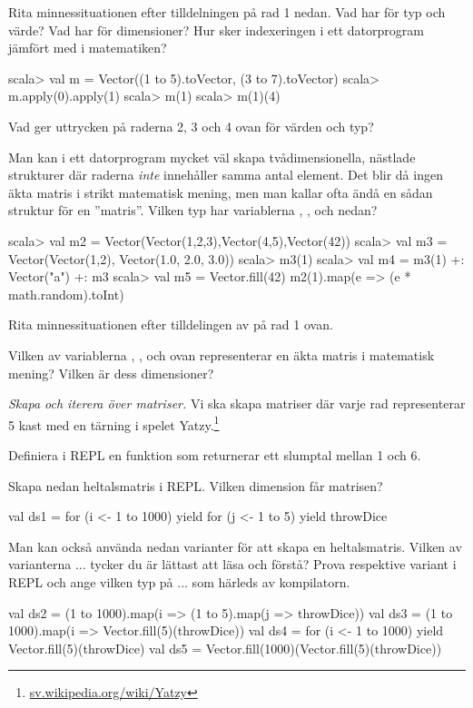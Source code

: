 \Subtask\Pen Rita minnessituationen efter tilldelningen på rad 1 nedan. Vad har  för typ och värde? Vad har  för dimensioner? Hur sker indexeringen i ett datorprogram jämfört med i matematiken?

\begin{REPL}
scala> val m = Vector((1 to 5).toVector, (3 to 7).toVector)
scala> m.apply(0).apply(1)
scala> m(1)
scala> m(1)(4)
\end{REPL}

\Subtask Vad ger uttrycken på raderna 2, 3 och 4 ovan för värden och typ?

\Subtask Man kan i ett datorprogram mycket väl skapa tvådimensionella, nästlade strukturer där raderna \emph{inte} innehåller samma antal element. Det blir då ingen äkta matris i strikt matematisk mening, men man kallar ofta ändå en sådan struktur för en ''matris''. Vilken typ har variablerna , ,  och  nedan?

\begin{REPL}
scala> val m2 = Vector(Vector(1,2,3),Vector(4,5),Vector(42))
scala> val m3 = Vector(Vector(1,2), Vector(1.0, 2.0, 3.0))
scala> m3(1)
scala> val m4 = m3(1) +: Vector("a") +: m3
scala> val m5 = Vector.fill(42){ m2(1).map(e => (e * math.random).toInt) }
\end{REPL}

\Subtask\Pen Rita minnessituationen efter tilldelingen av  på rad 1 ovan.

\Subtask\Pen Vilken av variablerna , ,  och  ovan representerar en äkta matris i matematisk mening? Vilken är dess dimensioner?



\Task \emph{Skapa och iterera över matriser.} Vi ska skapa matriser där varje rad representerar 5 kast med en tärning i spelet Yatzy.\footnote{\href{https://sv.wikipedia.org/wiki/Yatzy}{sv.wikipedia.org/wiki/Yatzy}}


\Subtask Definiera i REPL en funktion  som returnerar ett slumptal mellan 1 och 6.


\Subtask Skapa nedan heltalsmatris i REPL. Vilken dimension får matrisen?
\begin{REPL}
val ds1 = for (i <- 1 to 1000) yield {
            for (j <- 1 to 5) yield throwDice
          }
\end{REPL}

\Subtask\Pen Man kan också använda nedan varianter för att skapa en heltalsmatris. Vilken av varianterna  ...  tycker du är lättast att läsa och förstå? Prova respektive variant i REPL och ange vilken typ på  ...  som härleds av kompilatorn.
\begin{REPL}
val ds2 = (1 to 1000).map(i => (1 to 5).map(j => throwDice))
val ds3 = (1 to 1000).map(i => Vector.fill(5)(throwDice))
val ds4 = for (i <- 1 to 1000) yield Vector.fill(5)(throwDice)
val ds5 = Vector.fill(1000)(Vector.fill(5)(throwDice))
\end{REPL}


